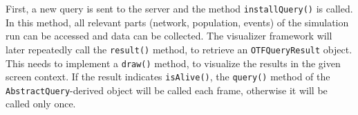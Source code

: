 First, a new query is sent to the server and the method \lstinline|installQuery()| is called. 
In this method, all relevant parts (network, population, events) of the simulation run can be accessed and data can be collected. 
The visualizer framework will later repeatedly call the \lstinline|result()| method, to retrieve an \lstinline|OTFQueryResult| object. 
This needs to implement a \lstinline|draw()| method, to visualize the results in the given screen context. 
If the result indicates \lstinline|isAlive()|, the \lstinline|query()| method of the \lstinline|AbstractQuery|-derived object will be called each frame, otherwise it will be called only once.










